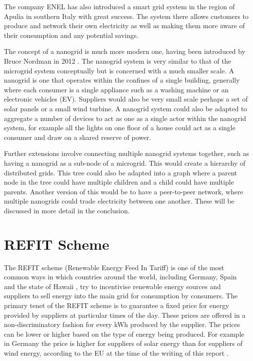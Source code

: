 \documentclass[a4paper, notitlepage]{report}
\begin{document}
The company ENEL has also introduced a smart grid system in the region of Apulia
in southern Italy \cite{sapienza2013enel} with great success. The system there
allows customers to produce and network their own electricity as well as making
them more aware of their consumption and any potential savings.

The concept of a nanogrid is much more modern one, having been introduced
by Bruce Nordman in 2012 \cite{nordman2012think}. The nanogrid system is very
similar to that of the microgrid system conceptually but is concerned with a
much smaller scale. A nanogrid is one that operates within the confines of a
single building, generally where each consumer is a single appliance such as a
washing machine or an electronic vehicles (EV). Suppliers would also be very
small scale perhaps a set of solar panels or a small wind turbine. A nanogrid
system could also be adapted to aggregate a number of devices to act as one as a
single actor within the nanogrid system, for example all the lights on one floor
of a house could act as a single consumer and draw on a shared reserve of power.

Further extensions involve connecting multiple nanogrid systems together, such
as having a nanogrid as a sub-node of a microgrid. This would create a hierarchy
of distributed grids. This tree could also be adapted into a graph where a
parent node in the tree could have multiple children and a child could have
multiple parents. Another version of this would be to have a peer-to-peer
network, where multiple nanogrids could trade electricity between one another.
These will be discussed in more detail in the conclusion.
\chapter{REFIT Scheme}
\label{sec:org280766b}
The REFIT scheme (Renewable Energy Feed In Tariff) is one of the most common
ways in which countries around the world, including Germany, Spain and the state
of Hawaii \cite{couture2010analysis}, try to incentivise renewable energy sources
and suppliers to sell energy into the main grid for consumption by consumers.
The primary tenet of the REFIT scheme is to guarantee a fixed price for energy
provided by suppliers at particular times of the day. These prices are offered
in a non-discriminatory fashion for every kWh produced by the supplier. The
prices can be lower or higher based on the type of energy being produced. For
example in Germany the price is higher for suppliers of solar energy than for
suppliers of wind energy, according to the EU at the time of the writing of this
report \cite{refit_germany}.
\end{document}
